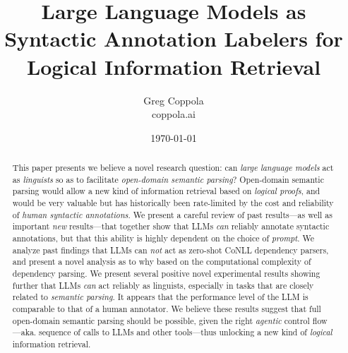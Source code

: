 \documentclass[11pt]{article}
\title{Large Language Models as Syntactic Annotation Labelers for Logical Information Retrieval}
\author{Greg Coppola\\coppola.ai}
\date{\today}
\begin{document}
\maketitle

\begin{abstract}
This paper presents we believe a novel research question: can \emph{large language models} act as \emph{linguists} so as to facilitate \emph{open-domain semantic parsing}?
Open-domain semantic parsing would allow a new kind of information retrieval based on \emph{logical proofs}, and would be very valuable but has historically been rate-limited by the cost and reliability of \emph{human syntactic annotations}.
We present a careful review of past results---as well as important {\em new} results---that together show that LLMs \emph{can} reliably annotate syntactic annotations, but that this ability is highly dependent on the choice of \emph{prompt}.
We analyze past findings that LLMs can \emph{not} act as zero-shot CoNLL dependency parsers, and present a novel analysis as to why based on the computational complexity of dependency parsing.
We present several positive novel experimental results showing further that LLMs \emph{can} act reliably as linguists, especially in tasks that are closely related to \emph{semantic parsing}.
It appears that the performance level of the LLM is comparable to that of a human annotator.
We believe these results suggest that full open-domain semantic parsing should be possible, given the right \emph{agentic} control flow---aka. sequence of calls to LLMs and other tools---thus unlocking a new kind of \emph{logical} information retrieval.
\end{abstract}
\end{document}
